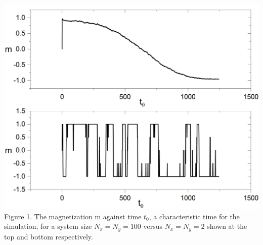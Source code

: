 \documentclass{article}
\begin{document}
\begin{multicols*}{2}
\newline
\newline
\begin{Figure}
\centering
\includegraphics[width=\linewidth]{2x250x50mag.jpg}
\footnotesize
Figure 1. The magnetization m against time $t_{0}$, a characteristic time for the simulation, for a system size $N_{x}=N_{y}=100$ versus $N_{x}=N_{y}=2$ shown at the top and bottom respectively.
\end{Figure}
\normalsize
\newline
\newline


\end{multicols*}
\end{document}
